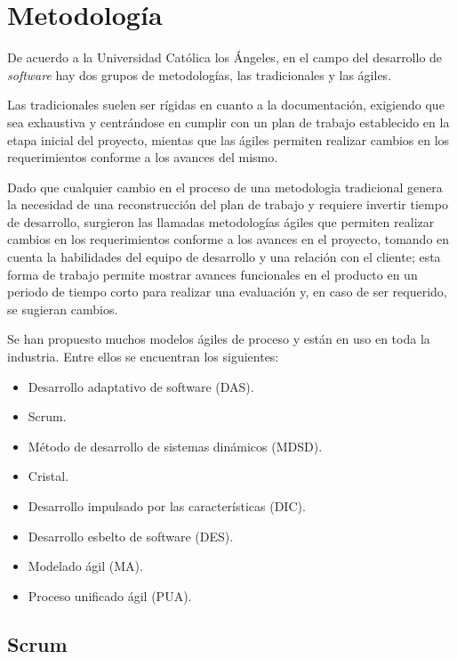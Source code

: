\section{Metodología}

De acuerdo a la Universidad Católica los Ángeles\cite{universidad_catolica_los_angeles_metodologidesarrollo_2020}, en el campo del desarrollo de \textit{software} hay dos grupos de metodologías, las tradicionales y las ágiles.


Las tradicionales suelen ser rígidas en cuanto a la documentación, exigiendo que sea exhaustiva y centrándose en cumplir con un plan de trabajo establecido en la etapa inicial del proyecto, mientas que las ágiles permiten realizar cambios en los requerimientos conforme a los avances del mismo.




Dado que cualquier cambio en el proceso de una metodologia tradicional genera la necesidad de una reconstrucción del plan de trabajo y requiere invertir tiempo de desarrollo, surgieron las llamadas metodologías ágiles que permiten realizar cambios en los requerimientos conforme a los avances en el proyecto, tomando en cuenta la habilidades del equipo de desarrollo y una relación con el cliente; esta forma de trabajo permite mostrar avances funcionales en el producto en un periodo de tiempo corto para realizar una evaluación y, en caso de ser requerido, se sugieran cambios.


Se han propuesto muchos modelos ágiles de proceso y están en uso en toda la industria. Entre ellos se encuentran los siguientes:


\begin{itemize}
	\item Desarrollo adaptativo de software (DAS).
	\item Scrum.
	\item Método de desarrollo de sistemas dinámicos (MDSD).
	\item Cristal.
	\item Desarrollo impulsado por las características (DIC).
	\item Desarrollo esbelto de software (DES).
	\item Modelado ágil (MA).
	\item Proceso unificado ágil (PUA).
\end{itemize}

\subsection{Scrum}

